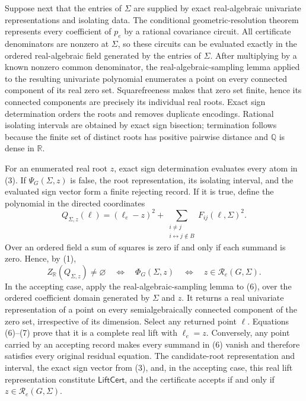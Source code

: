 Suppose next that the entries of \(\Sigma\) are supplied by exact real-algebraic univariate representations and isolating data.  The conditional geometric-resolution theorem represents every coefficient of \(p_e\) by a rational covariance circuit.  All certificate denominators are nonzero at \(\Sigma\), so these circuits can be evaluated exactly in the ordered real-algebraic field generated by the entries of \(\Sigma\).  After multiplying by a known nonzero common denominator, the real-algebraic-sampling lemma applied to the resulting univariate polynomial enumerates a point on every connected component of its real zero set.  Squarefreeness makes that zero set finite, hence its connected components are precisely its individual real roots.  Exact sign determination orders the roots and removes duplicate encodings.  Rational isolating intervals are obtained by exact sign bisection; termination follows because the finite set of distinct roots has positive pairwise distance and \(\mathbb Q\) is dense in \(\mathbb R\).

For an enumerated real root \(z\), exact sign determination evaluates every atom in (3).  If \(\Psi_G(\Sigma,z)\) is false, the root representation, its isolating interval, and the evaluated sign vector form a finite rejecting record.  If it is true, define the polynomial in the directed coordinates
\[
 Q_{\Sigma,z}(\ell)
 = (\ell_e-z)^2
   +\sum_{\substack{i\ne j\\i\leftrightarrow j\notin B}}
        F_{ij}(\ell,\Sigma)^2.                                 \tag{6}
\]
Over an ordered field a sum of squares is zero if and only if each summand is zero.  Hence, by (1),
\[
 Z_{\mathbb R}(Q_{\Sigma,z})\ne\varnothing
 \quad\Longleftrightarrow\quad
 \Phi_G(\Sigma,z)
 \quad\Longleftrightarrow\quad
 z\in\mathcal R_e(G,\Sigma).                                  \tag{7}
\]
In the accepting case, apply the real-algebraic-sampling lemma to (6), over the ordered coefficient domain generated by \(\Sigma\) and \(z\).  It returns a real univariate representation of a point on every semialgebraically connected component of the zero set, irrespective of its dimension.  Select any returned point \(\ell\).  Equations (6)--(7) prove that it is a complete real lift with \(\ell_e=z\).  Conversely, any point carried by an accepting record makes every summand in (6) vanish and therefore satisfies every original residual equation.  The candidate-root representation and interval, the exact sign vector from (3), and, in the accepting case, this real lift representation constitute \(\mathsf{LiftCert}\), and the certificate accepts if and only if \(z\in\mathcal R_e(G,\Sigma)\).

